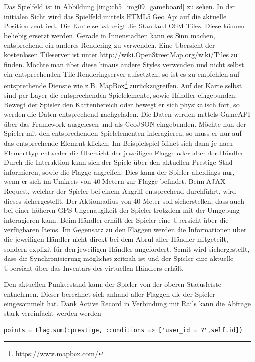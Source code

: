 Das Spielfeld ist in Abbildung \ref{img:ch5_img09_gameboard} zu sehen. In der initialen Sicht wird das Spielfeld mittels HTML5 Geo Api auf die aktuelle Position zentriert. Die Karte selbst zeigt die Standard OSM Tiles. Diese können beliebig ersetzt werden. Gerade in Innenstädten kann es Sinn machen, entsprechend ein anderes Rendering zu verwenden. Eine Übersicht der kostenlosen Tileserver ist unter \url{http://wiki.OpenStreetMap.org/wiki/Tiles} zu finden. Möchte man über diese hinaus andere Styles verwenden und nicht selbst ein entsprechenden Tile-Renderingserver aufsetzten, so ist es zu empfehlen auf entsprechende Dienste wie z.B. MapBox\footnote{\url{https://www.mapbox.com/}} zurückzugreifen. Auf der Karte selbst sind per Layer die entsprechenden Spielelemente, sowie Händler eingebunden. Bewegt der Spieler den Kartenbereich oder bewegt er sich physikalisch fort, so werden die Daten entsprechend nachgeladen. Die Daten werden mittels GameAPI über das Framework ausgelesen und als GeoJSON eingebunden. Möchte nun der Spieler mit den entsprechenden Spielelementen interagieren, so muss er nur auf das entsprechende Element klicken. Im Beispielspiel öffnet sich dann je nach Elementtyp entweder die Übersicht der jeweiligen Flagge oder aber der Händler. Durch die Interaktion kann sich der Spiele über den aktuellen Prestige-Stnd informieren, sowie die Flagge angreifen. Dies kann der Spieler allerdings nur, wenn er sich im Umkreis von 40 Metern zur Flagge befindet. Beim AJAX Request, welcher der Spieler bei einem Angriff entsprechend durchführt, wird dieses sichergestellt. Der Aktionradius von 40 Meter soll sicherstellen, dass auch bei einer höheren GPS-Ungenaugikeit der Spieler trotzdem mit der Umgebung interagieren kann.
Beim Händler erhält der Spieler eine Übersicht über die verfügbaren Items. Im Gegensatz zu den Flaggen werden die Informationen über die jeweiligen Händler nicht direkt bei dem Abruf aller Händler mitgeteilt, sondern explizit für den jeweiligen Händler angefordert. Somit wird sichergestellt, dass die Synchronisierung möglichst zeitnah ist und der Spieler eine aktuelle Übersicht über das Inventars des virtuellen Händlers erhält.

Den aktuellen Punktestand kann der Spieler von der oberen Statusleiste entnehmen. Dieser berechnet sich anhand aller Flaggen die der Spieler eingesammelt hat. Dank Active Record in Verbindung mit Rails kann die Abfrage stark vereinfacht werden werden:
\\
\lstset{
   language=Ruby
}

\begin{lstlisting}[caption=Ruby - Abfrage der Spielerpunkte, label=code:ch5:activerecord01]
points = Flag.sum(:prestige, :conditions => ['user_id = ?',self.id])
\end{lstlisting}

